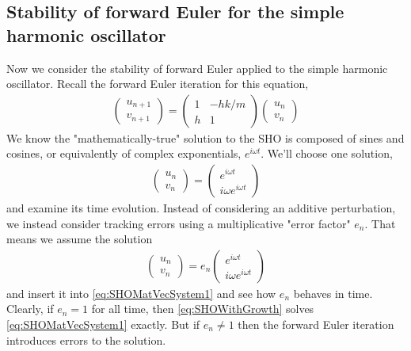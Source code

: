 \documentclass[hidelinks,notitlepage]{book}
\begin{document}
\subsection{Stability of forward Euler for the simple harmonic oscillator}
\label{sect:FwdEulerSHOStability}
Now we consider the stability of forward Euler applied to the simple harmonic oscillator.  Recall the forward Euler iteration for this equation,
\begin{align}
\label{eq:SHOMatVecSystem1}
\begin{pmatrix}
u_{n+1} \\
v_{n+1}
\end{pmatrix}
=
\begin{pmatrix}
1 & -h k / m \\
h & 1
\end{pmatrix}
\begin{pmatrix}
u_{n} \\
v_{n}
\end{pmatrix}
\end{align}
We know the "mathematically-true" solution to the SHO is composed of sines and cosines, or equivalently of complex exponentials, $e^{i \omega t}$.  We'll choose one solution,
\begin{align}
\nonumber
\begin{pmatrix}
u_{n} \\
v_{n}
\end{pmatrix}
=
\begin{pmatrix}
e^{i \omega t} \\
i \omega e^{i \omega t}
\end{pmatrix}
\end{align}
and examine its time evolution.  
Instead of considering an additive perturbation, we instead consider tracking errors using a multiplicative "error factor" $e_n$.  That means we assume the solution 
\begin{align}
\label{eq:SHOWithGrowth}
\begin{pmatrix}
u_{n} \\
v_{n}
\end{pmatrix}
=
e_n
\begin{pmatrix}
e^{i \omega t} \\
i \omega e^{i \omega t}
\end{pmatrix}
\end{align}
and insert it into \cref{eq:SHOMatVecSystem1} and see how $e_n$ behaves in time.  Clearly, if $e_n = 1$ for all time, then \cref{eq:SHOWithGrowth} solves \cref{eq:SHOMatVecSystem1} exactly.  But if $e_n \ne 1$ then the forward Euler iteration introduces errors to the solution.
\end{document}
